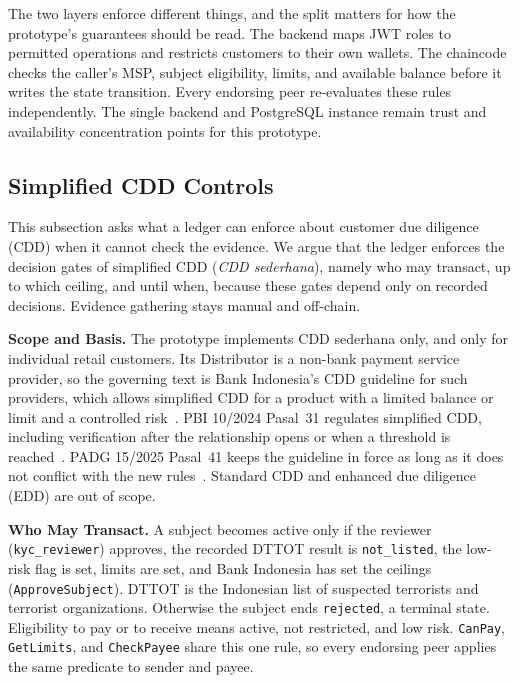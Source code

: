 \documentclass[conference]{IEEEtran}
\begin{document}
The two layers enforce different things, and the split matters for how the
prototype's guarantees should be read. The backend maps JWT roles to permitted
operations and restricts customers to their own wallets. The chaincode checks the
caller's MSP, subject eligibility, limits, and available balance before it writes
the state transition. Every endorsing peer re-evaluates these rules independently.
The single backend and PostgreSQL instance remain trust and availability
concentration points for this prototype.

\subsection{Simplified CDD Controls}
\label{sec:cdd}
This subsection asks what a ledger can enforce about customer due diligence (CDD)
when it cannot check the evidence. We argue that the ledger enforces the decision
gates of simplified CDD (\emph{CDD sederhana}), namely who may transact, up to which
ceiling, and until when, because these gates depend only on recorded decisions.
Evidence gathering stays manual and off-chain.

\textbf{Scope and Basis.} The prototype implements CDD sederhana only, and only for
individual retail customers. Its Distributor is a non-bank payment service provider,
so the governing text is Bank Indonesia's CDD guideline for such providers, which
allows simplified CDD for a product with a limited balance or limit and a controlled
risk~\cite{bi2023pedoman}. PBI 10/2024 Pasal~31 regulates simplified CDD, including
verification after the relationship opens or when a threshold is
reached~\cite{bi2024pbi10}. PADG 15/2025 Pasal~41 keeps the guideline in force as
long as it does not conflict with the new rules~\cite{bi2025padg15}. Standard CDD and
enhanced due diligence (EDD) are out of scope.

\textbf{Who May Transact.} A subject becomes active only if the reviewer
(\texttt{kyc\_reviewer}) approves, the recorded DTTOT result is \texttt{not\_listed},
the low-risk flag is set, limits are set, and Bank Indonesia has set the ceilings
(\texttt{ApproveSubject}). DTTOT is the Indonesian list of suspected terrorists and
terrorist organizations. Otherwise the subject ends \texttt{rejected}, a terminal state. Eligibility to pay or to receive
means active, not restricted, and low risk. \texttt{CanPay}, \texttt{GetLimits}, and
\texttt{CheckPayee} share this one rule, so every endorsing peer applies the same
predicate to sender and payee.
\end{document}
